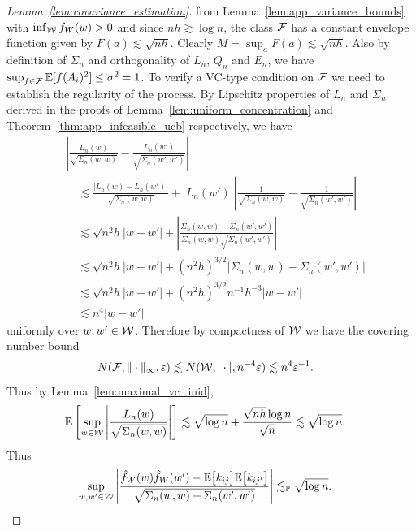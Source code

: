 \begin{proof}[Lemma~\ref{lem:covariance_estimation}]
  from Lemma~\ref{lem:app_variance_bounds}
  with $\inf_{\mathcal{W}} f_W(w) > 0$ and since $n h \gtrsim \log n$,
  the class $\mathcal{F}$ has a constant envelope function
  given by $F(a) \lesssim \sqrt{n h}$.
  Clearly $M = \sup_a F(a) \lesssim \sqrt{n h}$.
  Also by definition of $\Sigma_n$
  and orthogonality of $L_n$, $Q_n$ and $E_n$,
  we have
  $\sup_{f \in \mathcal{F}} \mathbb{E}[f(A_i)^2] \leq \sigma^2 = 1$.
  To verify a VC-type condition on $\mathcal{F}$
  we need to establish the regularity of the process.
  By Lipschitz properties
  of $L_n$ and $\Sigma_n$
  derived in the proofs of Lemma~\ref{lem:uniform_concentration}
  and Theorem~\ref{thm:app_infeasible_ucb}
  respectively,
  we have
  \begin{align*}
    &\left|
    \frac{L_n(w)}
    {\sqrt{\Sigma_n(w,w)}}
    - \frac{L_n(w')}
    {\sqrt{\Sigma_n(w',w')}}
    \right| \\
    &\quad\lesssim
    \frac{\big|L_n(w) - L_n(w')\big|}
    {\sqrt{\Sigma_n(w,w)}}
    +
    \left| L_n(w') \right|
    \left|
    \frac{1}
    {\sqrt{\Sigma_n(w,w)}}
    - \frac{1}
    {\sqrt{\Sigma_n(w',w')}}
    \right| \\
    &\quad\lesssim
    \sqrt{n^2h}
    |w-w'|
    +\left|
    \frac{\Sigma_n(w,w) - \Sigma_n(w',w')}
    {\Sigma_n(w,w)\sqrt{\Sigma_n(w',w')}}
    \right| \\
    &\quad\lesssim
    \sqrt{n^2h}
    |w-w'|
    + (n^2h)^{3/2}
    \left|
    \Sigma_n(w,w) - \Sigma_n(w',w')
    \right| \\
    &\quad\lesssim
    \sqrt{n^2h}
    |w-w'|
    + (n^2h)^{3/2}
    n^{-1} h^{-3}
    |w-w'| \\
    &\quad\lesssim
    n^4 |w-w'|
  \end{align*}
  uniformly over $w,w' \in \mathcal{W}$.
  Therefore by compactness of $\mathcal{W}$
  we have the covering number bound
  \begin{align*}
    N(\mathcal{F}, \|\cdot\|_\infty, \varepsilon)
    &\lesssim
    N(\mathcal{W}, |\cdot|, n^{-4} \varepsilon)
    \lesssim n^4 \varepsilon^{-1}.
  \end{align*}
  Thus by Lemma~\ref{lem:maximal_vc_inid},
  \begin{align*}
    \mathbb{E} \left[
      \sup_{w \in \mathcal{W}}
      \left|
      \frac{L_n(w)}
      {\sqrt{\Sigma_n(w,w)}}
      \right|
    \right]
    &\lesssim
    \sqrt{\log n}
    + \frac{\sqrt{n h} \log n}{\sqrt{n}}
    \lesssim
    \sqrt{\log n}.
  \end{align*}
  Thus
  \begin{align*}
    \sup_{w,w' \in \mathcal{W}}
    \left|
    \frac{
      \hat f_W(w) \hat f_W(w')
    - \mathbb{E}\big[k_{i j}\big] \mathbb{E}\big[k_{i j'}\big]}
    {\sqrt{\Sigma_n(w,w) + \Sigma_n(w',w')}}
    \right|
    &\lesssim_{\mathbb{P}}
    \sqrt{\log n}.
  \end{align*}


\end{proof}
